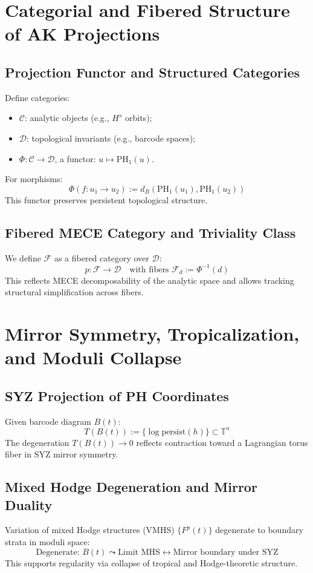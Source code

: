 \documentclass[11pt]{article}
\theoremstyle{remark}
\begin{document}
\section{Categorial and Fibered Structure of AK Projections}

\subsection{Projection Functor and Structured Categories}
Define categories:
\begin{itemize}
  \item $\mathcal{C}$: analytic objects (e.g., $H^s$ orbits);
  \item $\mathcal{D}$: topological invariants (e.g., barcode spaces);
  \item $\Phi: \mathcal{C} \to \mathcal{D}$, a functor: $u \mapsto \mathrm{PH}_1(u)$.
\end{itemize}
For morphisms:
\[
\Phi(f: u_1 \to u_2) := d_B(\mathrm{PH}_1(u_1), \mathrm{PH}_1(u_2))
\]
This functor preserves persistent topological structure.

\subsection{Fibered MECE Category and Triviality Class}
We define $\mathcal{F}$ as a fibered category over $\mathcal{D}$:
\[
p: \mathcal{F} \to \mathcal{D} \quad \text{with fibers } \mathcal{F}_d := \Phi^{-1}(d)
\]
This reflects MECE decomposability of the analytic space and allows tracking structural simplification across fibers.

\section{Mirror Symmetry, Tropicalization, and Moduli Collapse}

\subsection{SYZ Projection of PH Coordinates}
Given barcode diagram $B(t)$:
\[
T(B(t)) := \{ \log \text{persist}(h) \} \subset \mathbb{T}^n
\]
The degeneration $T(B(t)) \to 0$ reflects contraction toward a Lagrangian torus fiber in SYZ mirror symmetry.

\subsection{Mixed Hodge Degeneration and Mirror Duality}
Variation of mixed Hodge structures (VMHS) $\{ F^p(t) \}$ degenerate to boundary strata in moduli space:
\[
\text{Degenerate: } B(t) \leadsto \text{Limit MHS} \leftrightarrow \text{Mirror boundary under SYZ}
\]
This supports regularity via collapse of tropical and Hodge-theoretic structure.
\end{document}
